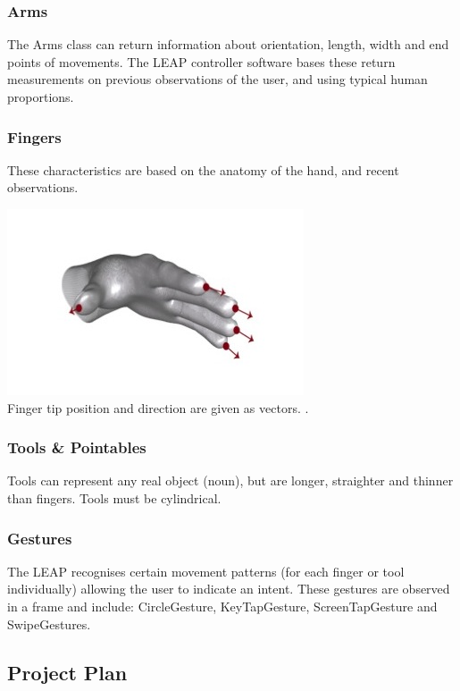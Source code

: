 \documentclass[10pt]{article}
\begin{document}
\subsubsection{Arms}
The Arms class can return information about orientation, length, width and end points of movements. The LEAP controller software bases these return measurements on previous observations of the user, and using typical human proportions.

\subsubsection{Fingers}
These characteristics are based on the anatomy of the hand, and recent observations. 

\begin{center}
\includegraphics[scale=0.7]{fingers}\\
Finger tip position and direction are given as vectors. \cite{leap}.
\end{center}


\subsubsection{Tools \& Pointables}
Tools can represent any real object (noun), but are longer, straighter and thinner than fingers. Tools must be cylindrical.

\subsubsection{Gestures}
The LEAP recognises certain movement patterns (for each finger or tool individually) allowing the user to indicate an intent. These gestures are observed in a frame and include: CircleGesture, KeyTapGesture, ScreenTapGesture and SwipeGestures.


\subsection{Project Plan}\label{plan}
\end{document}
